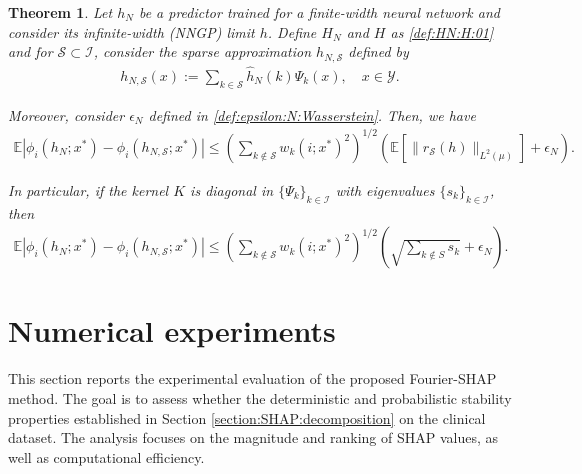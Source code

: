 \documentclass[letterpaper,11pt]{article}
\numberwithin{equation}{section}
\newtheorem{theorem}{Theorem}[section]
\renewcommand{\leq}{\leqslant}
\numberwithin{equation}{section}
\begin{document}
\begin{theorem}
    \label{thm:error:analysis:03}
    Let $h_N$ be a predictor trained for a finite-width neural network and consider its infinite-width (NNGP) limit $h$. Define $H_N$ and $H$ as \eqref{def:HN:H:01} and for $\mathcal{S}\subset \mathcal{I}$, consider the sparse approximation $h_{N,\mathcal{S}}$ defined by
    \begin{align*}
        h_{N,\mathcal{S}}(x):= \sum_{k\in \mathcal{S}} \hat{h}_N(k) \Psi_k(x),\quad x\in \mathcal{Y}.
    \end{align*}
    
    Moreover, consider $\epsilon_N$ defined in \eqref{def:epsilon:N:Wasserstein}. Then, we have 
    \begin{align}
        \label{eq:thm:W:02}
        \mathbb{E} \left| \phi_i(h_N; x^*) - \phi_i(h_{N,\mathcal{S}}; x^*) \right| \leq \left(\sum_{k\notin \mathcal{S}} w_k(i;x^*)^2 \right)^{1/2} \left(  \mathbb{E}[\|r_\mathcal{S} (h)\|_{L^2(\mu)}] + \epsilon_N\right).
    \end{align}

    In particular, if the kernel $K$ is diagonal in $\{\Psi_k\}_{k\in \mathcal{I}}$ with eigenvalues $\{s_k\}_{k\in \mathcal{I}}$, then 
    \begin{align}
        \label{eq:thm:W:03}
        \mathbb{E} \left| \phi_i(h_N; x^*) - \phi_i(h_{N,\mathcal{S}}; x^*) \right| \leq \left(\sum_{k\notin \mathcal{S}} w_k(i;x^*)^2 \right)^{1/2} \left(  \sqrt{\sum_{k\notin S} s_k} + \epsilon_N\right).
    \end{align}
    
\end{theorem}



\section{Numerical experiments}
\label{section:numerical:experiments}


This section reports the experimental evaluation of the proposed Fourier-SHAP method. The goal is to assess whether the deterministic and probabilistic stability properties established in Section \ref{section:SHAP:decomposition} on the clinical dataset. The analysis focuses on the magnitude and ranking of SHAP values, as well as computational efficiency. 
\end{document}

